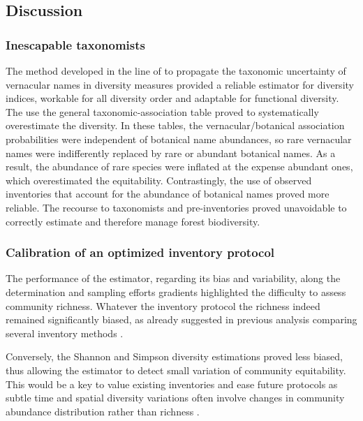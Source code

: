 \documentclass[
  11pt,
  french,
  A4paper,
  extrafontsizes,onecolumn,openright
  ]{memoir}
\begin{document}
\subsection{Discussion}\label{discussion}

\subsubsection{Inescapable taxonomists}\label{inescapable-taxonomists}

The method developed in the line of \textcite{Guitet2014b} to propagate
the taxonomic uncertainty of vernacular names in diversity measures
provided a reliable estimator for diversity indices, workable for all
diversity order and adaptable for functional diversity. The use the
general taxonomic-association table proved to systematically
overestimate the diversity. In these tables, the vernacular/botanical
association probabilities were independent of botanical name abundances,
so rare vernacular names were indifferently replaced by rare or abundant
botanical names. As a result, the abundance of rare species were
inflated at the expense abundant ones, which overestimated the
equitability. Contrastingly, the use of observed inventories that
account for the abundance of botanical names proved more reliable. The
recourse to taxonomists and pre-inventories proved unavoidable to
correctly estimate and therefore manage forest biodiversity.

\subsubsection{Calibration of an optimized inventory
protocol}\label{calibration-of-an-optimized-inventory-protocol}

The performance of the estimator, regarding its bias and variability,
along the determination and sampling efforts gradients highlighted the
difficulty to assess community richness. Whatever the inventory protocol
the richness indeed remained significantly biased, as already suggested
in previous analysis comparing several inventory methods
\autocite{Higgins2004}.

Conversely, the Shannon and Simpson diversity estimations proved less
biased, thus allowing the estimator to detect small variation of
community equitability. This would be a key to value existing
inventories and ease future protocols as subtle time and spatial
diversity variations often involve changes in community abundance
distribution rather than richness
\autocites{Baraloto2012}{Berry2008a}{Cannon1998}{Plumptre1996}.
\end{document}
